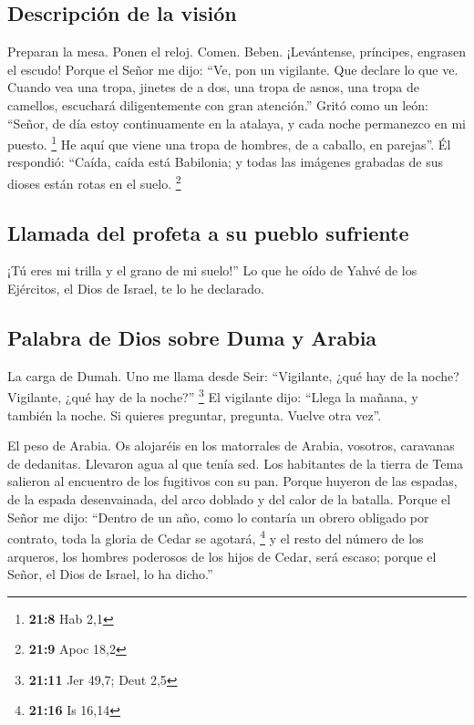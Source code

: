 \hypertarget{descripciuxf3n-de-la-visiuxf3n}{%
\subsection{Descripción de la
visión}\label{descripciuxf3n-de-la-visiuxf3n}}

 Preparan la mesa. Ponen el reloj. Comen. Beben.
¡Levántense, príncipes, engrasen el escudo!  Porque el
Señor me dijo: ``Ve, pon un vigilante. Que declare lo que ve.
 Cuando vea una tropa, jinetes de a dos, una tropa de
asnos, una tropa de camellos, escuchará diligentemente con gran
atención.''  Gritó como un león: ``Señor, de día estoy
continuamente en la atalaya, y cada noche permanezco en mi puesto.
\footnote{\textbf{21:8} Hab 2,1}  He aquí que viene una
tropa de hombres, de a caballo, en parejas''. Él respondió: ``Caída,
caída está Babilonia; y todas las imágenes grabadas de sus dioses están
rotas en el suelo. \footnote{\textbf{21:9} Apoc 18,2}

\hypertarget{llamada-del-profeta-a-su-pueblo-sufriente}{%
\subsection{Llamada del profeta a su pueblo
sufriente}\label{llamada-del-profeta-a-su-pueblo-sufriente}}

 ¡Tú eres mi trilla y el grano de mi suelo!'' Lo que he
oído de Yahvé de los Ejércitos, el Dios de Israel, te lo he declarado.

\hypertarget{palabra-de-dios-sobre-duma-y-arabia}{%
\subsection{Palabra de Dios sobre Duma y
Arabia}\label{palabra-de-dios-sobre-duma-y-arabia}}

 La carga de Dumah. Uno me llama desde Seir: ``Vigilante,
¿qué hay de la noche? Vigilante, ¿qué hay de la noche?'' \footnote{\textbf{21:11}
  Jer 49,7; Deut 2,5}  El vigilante dijo: ``Llega la
mañana, y también la noche. Si quieres preguntar, pregunta. Vuelve otra
vez''.

 El peso de Arabia. Os alojaréis en los matorrales de
Arabia, vosotros, caravanas de dedanitas.  Llevaron agua
al que tenía sed. Los habitantes de la tierra de Tema salieron al
encuentro de los fugitivos con su pan.  Porque huyeron de
las espadas, de la espada desenvainada, del arco doblado y del calor de
la batalla.  Porque el Señor me dijo: ``Dentro de un año,
como lo contaría un obrero obligado por contrato, toda la gloria de
Cedar se agotará, \footnote{\textbf{21:16} Is 16,14}  y
el resto del número de los arqueros, los hombres poderosos de los hijos
de Cedar, será escaso; porque el Señor, el Dios de Israel, lo ha
dicho.''

